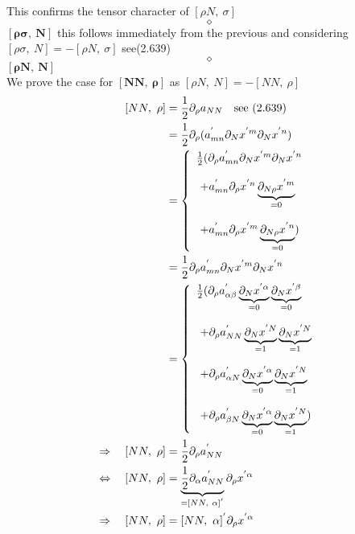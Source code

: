 This confirms the tensor character of $[ \rho N, \  \sigma] $
$$\diamond$$
$\boldsymbol{[ \rho \sigma, \  N]}$ this follows immediately from the previous and considering $[ \rho \sigma, \  N] = - [ \rho N, \  \sigma]$ see(2.639) \\
$$\diamond$$
$\boldsymbol{[\rho N, \ N ] }$\\
We prove the case for $\boldsymbol{[ NN, \ \rho ]}$  as $[\rho N, \ N ] = -[ NN, \ \rho ] $
\begin{align}
\ [ NN, \ \rho ] &= \half \partial_{\rho} a_{NN}\quad \text{see (2.639)}\\
\ &= \half \partial_{\rho} (a^{'}_{mn}\partial_{N}x^{'m}\partial_{N}x^{'n})\\
\ & = \left\{ \begin{array}{l}
\half (\partial_{\rho} a^{'}_{mn}\partial_{N}x^{'m}\partial_{N}x^{'n}\\\\
\ + a^{'}_{mn} \partial_{\rho}x^{'n} \underbrace{\partial_{N \rho}x^{'m}}_{=0}\\\\
\ + a^{'}_{mn} \partial_{\rho}x^{'m} \underbrace{\partial_{N \rho}x^{'n}}_{=0})
\end{array} \right.\\
\ &= \half \partial_{\rho} a^{'}_{mn}\partial_{N}x^{'m}\partial_{N}x^{'n}\\
\ &= \left\{ \begin{array}{l}
\half (\partial_{\rho} a^{'}_{\alpha\beta}\underbrace{\partial_{N}x^{'\alpha}}_{=0}\underbrace{\partial_{N}x^{'\beta}}_{=0}\\\\
\ +\partial_{\rho} a^{'}_{NN}\underbrace{\partial_{N}x^{'N}}_{=1}\underbrace{\partial_{N}x^{'N}}_{=1}\\\\
\ +\partial_{\rho} a^{'}_{\alpha N}\underbrace{\partial_{N}x^{'\alpha}}_{=0}\underbrace{\partial_{N}x^{'N}}_{=1}\\\\
\ +\partial_{\rho} a^{'}_{\beta N}\underbrace{\partial_{N}x^{'\alpha}}_{=0}\underbrace{\partial_{N}x^{'N}}_{=1})\\
\end{array} \right.\\
\Rightarrow \quad [ NN, \ \rho ] &= \half \partial_{\rho} a^{'}_{NN}\\
\Leftrightarrow \quad [ NN, \ \rho ] &=  \underbrace{\half \partial_{\alpha} a^{'}_{NN}}_{=[NN, \ \alpha]^{'}}\partial_{\rho}x^{'\alpha}\\
\Rightarrow \quad [ NN, \ \rho ] &=  [NN, \ \alpha]^{'} \partial_{\rho}x^{'\alpha}
\end{align}
